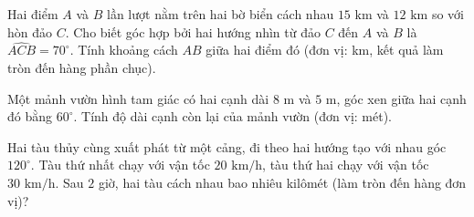 \begin{bt}%
	Hai điểm $A$ và $B$ lần lượt nằm trên hai bờ biển cách nhau $15\text{ km}$ và $12\text{ km}$ so với hòn đảo $C$. Cho biết góc hợp bởi hai hướng nhìn từ đảo $C$ đến $A$ và $B$ là $\widehat{ACB} = 70^\circ$. Tính khoảng cách $AB$ giữa hai điểm đó (đơn vị: km, kết quả làm tròn đến hàng phần chục).
\end{bt}

\begin{bt}%
	Một mảnh vườn hình tam giác có hai cạnh dài $8\text{ m}$ và $5\text{ m}$, góc xen giữa hai cạnh đó bằng $60^\circ$. Tính độ dài cạnh còn lại của mảnh vườn (đơn vị: mét).
\end{bt}

\begin{bt}%
	Hai tàu thủy cùng xuất phát từ một cảng, đi theo hai hướng tạo với nhau góc $120^\circ$. Tàu thứ nhất chạy với vận tốc $20\text{ km/h}$, tàu thứ hai chạy với vận tốc $30\text{ km/h}$. Sau $2$ giờ, hai tàu cách nhau bao nhiêu kilômét (làm tròn đến hàng đơn vị)?
\end{bt}

